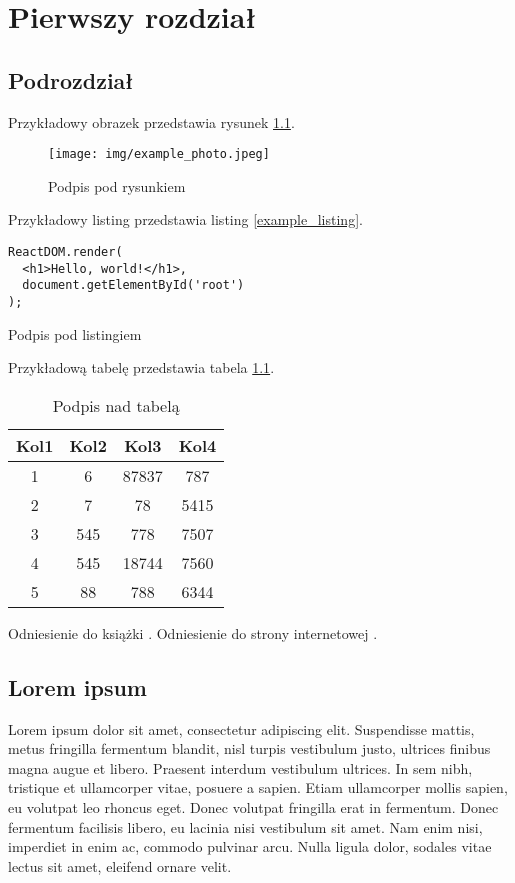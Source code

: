 \documentclass[a4paper,12pt,polish,twoside]{extreport}
\begin{document}
\tableofcontents

\chapter{Pierwszy rozdział}

\section{Podrozdział}

Przykładowy obrazek przedstawia rysunek \ref{example_image}.

\begin{figure}[H]
    \centering
    \texttt{[image: img/example\_photo.jpeg]}
    \caption[Podpis w spisie rysunków]{Podpis pod rysunkiem}
    \label{example_image}
\end{figure}

Przykładowy listing przedstawia listing \ref{example_listing}.

\begin{code}[H]
\begin{lstlisting}
ReactDOM.render(
  <h1>Hello, world!</h1>,
  document.getElementById('root')
);
\end{lstlisting}
\caption[Podpis w spisie listingów]{Podpis pod listingiem}
\label{example_listing}
\end{code}

Przykładową tabelę przedstawia tabela \ref{example_table}.
 
\begin{table}[H]
\centering
\begin{tabular}{|c | c | c | c|} 
 \hline
 Kol1 & Kol2 & Kol3 & Kol4 \\
 \hline
 1 & 6 & 87837 & 787 \\
 2 & 7 & 78 & 5415 \\
 3 & 545 & 778 & 7507 \\
 4 & 545 & 18744 & 7560 \\
 5 & 88 & 788 & 6344 \\
 \hline
\end{tabular}
\caption[Podpis w spisie tabel]{Podpis nad tabelą}
\label{example_table}
\end{table}

Odniesienie do książki \cite{example_book}. Odniesienie do strony internetowej \cite{example_website}.

\section{Lorem ipsum}
Lorem ipsum dolor sit amet, consectetur adipiscing elit. Suspendisse mattis, metus fringilla fermentum blandit, nisl turpis vestibulum justo, ultrices finibus magna augue et libero. Praesent interdum vestibulum ultrices. In sem nibh, tristique et ullamcorper vitae, posuere a sapien. Etiam ullamcorper mollis sapien, eu volutpat leo rhoncus eget. Donec volutpat fringilla erat in fermentum. Donec fermentum facilisis libero, eu lacinia nisi vestibulum sit amet. Nam enim nisi, imperdiet in enim ac, commodo pulvinar arcu. Nulla ligula dolor, sodales vitae lectus sit amet, eleifend ornare velit.
\end{document}
